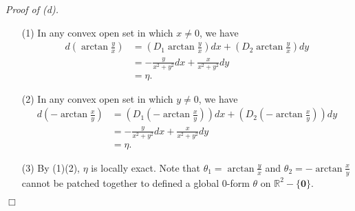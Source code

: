 \documentclass{article}
\begin{document}
\emph{Proof of (d).}
\begin{enumerate}
\item[(1)]
  In any convex open set in which $x \neq 0$,
  we have
  \begin{align*}
    d\left( \arctan\frac{y}{x} \right)
    &= \left( D_1\arctan\frac{y}{x} \right) dx
      + \left( D_2\arctan\frac{y}{x} \right) dy \\
    &= -\frac{y}{x^2+y^2} dx + \frac{x}{x^2+y^2} dy \\
    &= \eta.
  \end{align*}

\item[(2)]
  In any convex open set in which $y \neq 0$,
  we have
  \begin{align*}
    d\left( -\arctan\frac{x}{y} \right)
    &= \left( D_1\left(-\arctan\frac{x}{y}\right) \right) dx
      + \left( D_2\left(-\arctan\frac{x}{y}\right) \right) dy \\
    &= -\frac{y}{x^2+y^2} dx + \frac{x}{x^2+y^2} dy \\
    &= \eta.
  \end{align*}

\item[(3)]
  By (1)(2), $\eta$ is locally exact.
  Note that $\theta_1 = \arctan\frac{y}{x}$
  and $\theta_2 = -\arctan\frac{x}{y}$
  cannot be patched together to defined a global $0$-form $\theta$
  on $\mathbb{R}^2 - \{\mathbf{0}\}$.

\end{enumerate}
$\Box$ \\
\end{document}
